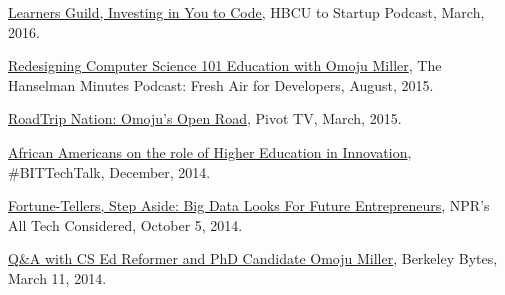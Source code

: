 \documentclass[11pt,article,oneside]{memoir}
\begin{document}
\ind \href{https://www.youtube.com/watch?v=T0wQRr4RuqM&ab_channel=HBCUtoStartup}{Learners Guild, Investing in You to Code,} HBCU to Startup Podcast, March, 2016.

\ind \href{http://hanselminutes.com/488/redesigning-computer-science-101-education-with-omoju-miller}{Redesigning Computer Science 101 Education with Omoju Miller}, The Hanselman Minutes Podcast: Fresh Air for Developers, August, 2015.

\ind \href{http://roadtripnation.com/leader/omoju-miller}{RoadTrip Nation: Omoju's Open Road}, Pivot TV, March, 2015.

\ind \href{https://www.blacksintechnology.net/the-road-to-50-podcast-african-americans-on-the-role-of-higher-education-in-innovation/}{African Americans on the role of Higher Education in Innovation}, \#BITTechTalk, December, 2014.

\ind \href{http://www.npr.org/sections/alltechconsidered/2014/10/05/351851015/fortune-tellers-step-aside-big-data-looks-for-future-entrepreneurs}{Fortune-Tellers, Step Aside: Big Data Looks For Future Entrepreneurs}, NPR's  All Tech Considered, October 5, 2014.

\ind \href{http://best.berkeley.edu/2015/03/11/best-labber-in-berkeley-byte-qa-with-cs-ed-reformer-and-phd-candidate-omoju-miller/}{Q\&A with CS Ed Reformer and PhD Candidate Omoju Miller}, Berkeley Bytes, March 11, 2014.
\end{document}
